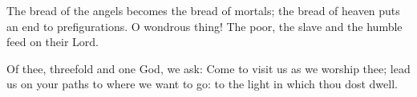 \begin{enpars}The bread of the angels
becomes the bread of mortals;
the bread of heaven
puts an end to prefigurations.
O wondrous thing!
The poor, the slave and the humble
feed on their Lord.

Of thee, threefold and
one God, we ask:
Come to visit us
as we worship thee;
lead us on your paths
to where we want to go:
to the light in which thou dost dwell.\end{enpars}